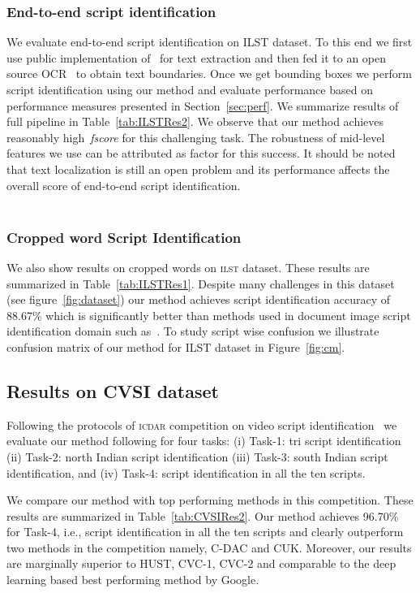 \subsubsection{End-to-end script identification}
We evaluate end-to-end script identification on ILST dataset. To this end we first use public implementation of~\cite{GomezK14} for text extraction and then fed it to an open source OCR~\cite{tessOCR} to obtain text boundaries. Once we get bounding boxes we perform script identification using our method and evaluate performance based on performance measures presented in Section~\ref{sec:perf}. We summarize results of full pipeline in Table~\ref{tab:ILSTRes2}. We observe that our method achieves reasonably high~\emph{fscore} for this challenging task. The robustness of mid-level features we use can be attributed as factor for this success. It should be noted that text localization
is still an open problem and its performance affects the overall score of end-to-end script identification.  
\\
\


\subsubsection{Cropped word Script Identification}
We also show results on cropped words on \textsc{ilst} dataset. These results
are summarized in Table~\ref{tab:ILSTRes1}. Despite many challenges 
in this dataset (see figure~\ref{fig:dataset}) our method achieves 
script identification accuracy of 88.67\% which is significantly 
better than methods used in document image script identification domain such as~\cite{Pati,LBPOjala2002}.  To study script wise confusion we illustrate confusion matrix of our method for ILST dataset in Figure~\ref{fig:cm}.

\subsection{Results on CVSI dataset}
Following the protocols of \textsc{icdar} competition on video script identification~\cite{CVSIComp} we evaluate our method
following for four tasks: (i) Task-1: tri script identification
(ii) Task-2: north Indian script identification (iii) Task-3:
south Indian script identification, and (iv) Task-4: script identification
in all the ten scripts. 

We compare our method with top performing methods in this competition.
These results are summarized in Table~\ref{tab:CVSIRes2}. Our method
achieves 96.70\% for Task-4, i.e., script identification in all the ten
scripts and clearly outperform two methods in the competition namely, \textsc{C-DAC}
and \textsc{CUK}. Moreover, our results are marginally superior to \textsc{HUST}, \textsc{CVC-1},
\textsc{CVC-2} and comparable to the deep learning based best performing method
by Google.

